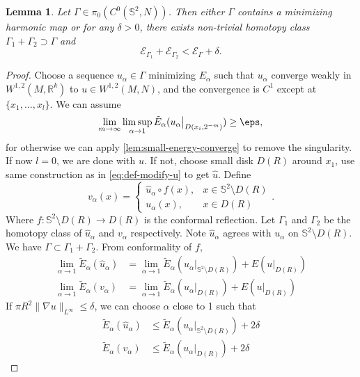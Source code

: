 \documentclass[UTF8,12pt]{article}
\theoremstyle{plain}\newtheorem{theorem}{Theorem}
\theoremstyle{definition}\newtheorem{definition}[theorem]{Definition}
\theoremstyle{definition}\newtheorem{example}[theorem]{Example}
\theoremstyle{plain}\newtheorem{axiom}[theorem]{Axiom}
\theoremstyle{plain}\newtheorem{assertion}[theorem]{Assertion}
\theoremstyle{plain}\newtheorem{corollary}[theorem]{Corollary}
\theoremstyle{plain}\newtheorem{lemma}[theorem]{Lemma}
\theoremstyle{plain}\newtheorem{proposition}[theorem]{Proposition}
\theoremstyle{plain}\newtheorem{prop}[theorem]{Proposition}
\theoremstyle{plain}\newtheorem{conjecture}[theorem]{Conjecture}
\theoremstyle{plain}\newtheorem{conj}[theorem]{Conjecture}
\theoremstyle{plain}\newtheorem{problem}[theorem]{Problem}
\theoremstyle{remark}\newtheorem{notation}[theorem]{Notation}
\theoremstyle{definition}\newtheorem*{question}{Question}
\theoremstyle{definition}\newtheorem*{answer}{Answer}
\theoremstyle{definition}\newtheorem*{goal}{Goal}
\theoremstyle{plain}\newtheorem*{application}{Application}
\theoremstyle{plain}\newtheorem*{exercise}{Exercise}
\theoremstyle{remark}\newtheorem*{remark}{Remark}
\theoremstyle{remark}\newtheorem*{note}{\small{Note}}
\numberwithin{equation}{section}
\numberwithin{theorem}{section}
\numberwithin{figure}{section}
\newcommand{\Eps}{\mathcal{E}}
\begin{document}
\begin{lemma}
    Let \(\Gamma\in \pi_0(C^0(\mathbb{S}^2,N))\). Then either \(\Gamma\) contains
    a minimizing harmonic map or for any \(\delta>0\), there exists non-trivial
    homotopy class \(\Gamma_1+\Gamma_2\supset \Gamma\) and  \[
        \Eps_{\Gamma_1}+\Eps_{\Gamma_2}<\Eps_\Gamma+\delta
    .\] 
\end{lemma}
\begin{proof}
    Choose a sequence \(u_\alpha\in\Gamma\) minimizing \(E_\alpha\) such that
    \(u_\alpha\) converge weakly in \(W^{1,2}(M,\mathbb{R}^k)\) to \(u\in W^{1,2}
    (M,N)\), and the convergence is \(C^1\) except at \(\{x_1,\ldots,x_l\}\).
    We can assume \[
        \lim_{m\to \infty}\limsup_{\alpha\to 1}
        \tilde{E}_\alpha(u_\alpha\big|_{D(x_i,2^{-m})})\ge \eps
    ,\] for otherwise we can apply \cref{lem:small-energy-converge} to remove the
    singularity. If now \(l=0\), we are done with \(u\). If not, choose small
    disk \(D(R)\) around \(x_1\), use same construction as in \cref{eq:def-modify-u}
    to get \(\hat{u}\). Define \[
        v_\alpha(x)=\begin{cases}
            \hat{u}_\alpha\circ f(x), & x\in \mathbb{S}^2\setminus D(R) \\
            u_\alpha(x), & x\in D(R)
        \end{cases}
    .\] Where \(f\colon \mathbb{S}^2\setminus D(R)\to D(R)\) is the conformal
    reflection. Let \(\Gamma_1\) and \(\Gamma_2\) be the homotopy class of \(\hat{u}
    _\alpha\) and \(v_\alpha\) respectively. Note \(\hat{u}_\alpha\) agrees with
    \(u_\alpha\) on \(\mathbb{S}^2\setminus D(R)\). We have \(\Gamma\subset 
    \Gamma_1+\Gamma_2\). From conformality of \(f\),
    \begin{align*}
        \lim_{\alpha \to 1} \tilde{E}_\alpha(\hat{u}_\alpha)&=\lim_{\alpha\to 1}
        \tilde{E}_\alpha(u_\alpha\big|_{\mathbb{S}^2\setminus D(R)})
        +E(u\big|_{D(R)}) \\
        \lim_{\alpha \to 1} \tilde{E}_\alpha(v_\alpha)&=\lim_{\alpha\to 1}
        \tilde{E}_\alpha(u_\alpha\big|_{D(R)})+E(u\big|_{D(R)})
    \end{align*}
    If \(\pi R^2\|\nabla u\|_{L^\infty}\le\delta\), we can choose
    \(\alpha\) close to 1 such that 
    \begin{align*}
        \tilde{E}_\alpha(\hat{u}_\alpha)&\le
        \tilde{E}_\alpha(u_\alpha\big|_{\mathbb{S}^2\setminus D(R)})+2\delta \\ 
        \tilde{E}_\alpha(v_\alpha)&\le \tilde{E}_\alpha(u_\alpha\big|_{D(R)})+2\delta

\end{align*}
\end{proof}
\end{document}
